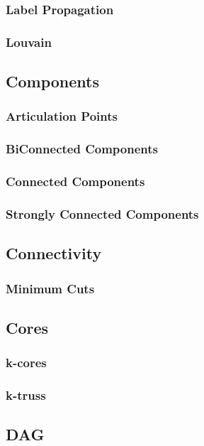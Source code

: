 \subsubsection{Label Propagation}
\subsubsection{Louvain}

\subsection{Components}
\subsubsection{Articulation Points}
\subsubsection{BiConnected Components}
\subsubsection{Connected Components}
\subsubsection{Strongly Connected Components}

\subsection{Connectivity}
\subsubsection{Minimum Cuts}

\subsection{Cores}
\subsubsection{k-cores}
\subsubsection{k-truss}

\subsection{DAG}

